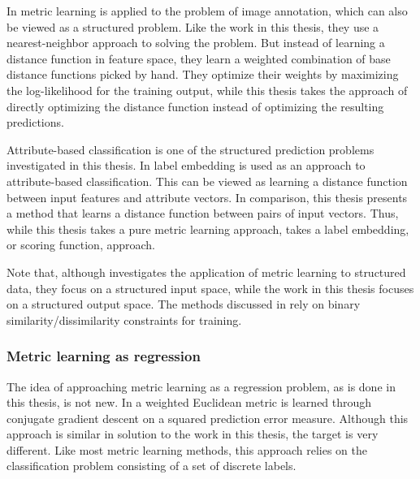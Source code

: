In \cite{guillaumin2009tagprop} metric learning is applied to the problem of image annotation, which can also be viewed as a structured problem. Like the work in this thesis, they use a nearest-neighbor approach to solving the problem. But instead of learning a distance function in feature space, they learn a weighted combination of base distance functions picked by hand. They optimize their weights by maximizing the log-likelihood for the training output, while this thesis takes the approach of directly optimizing the distance function instead of optimizing the resulting predictions.

Attribute-based classification is one of the structured prediction problems investigated in this thesis. In \cite{akata2013label} label embedding is used as an approach to attribute-based classification. This can be viewed as learning a distance function between input features and attribute vectors. In comparison, this thesis presents a method that learns a distance function between pairs of input vectors. Thus, while this thesis takes a pure metric learning approach, \cite{akata2013label} takes a label embedding, or scoring function, approach.

Note that, although \cite{bellet2013survey} investigates the application of metric learning to structured data, they focus on a structured input space, while the work in this thesis focuses on a structured output space. The methods discussed in \cite{bellet2013survey} rely on binary similarity/dissimilarity constraints for training.


\subsubsection{Metric learning as regression}

The idea of approaching metric learning as a regression problem, as is done in this thesis, is not new. In \cite{lowe1995similarity} a weighted Euclidean metric is learned through conjugate gradient descent on a squared prediction error measure. Although this approach is similar in solution to the work in this thesis, the target is very different. Like most metric learning methods, this approach relies on the classification problem consisting of a set of discrete labels.

